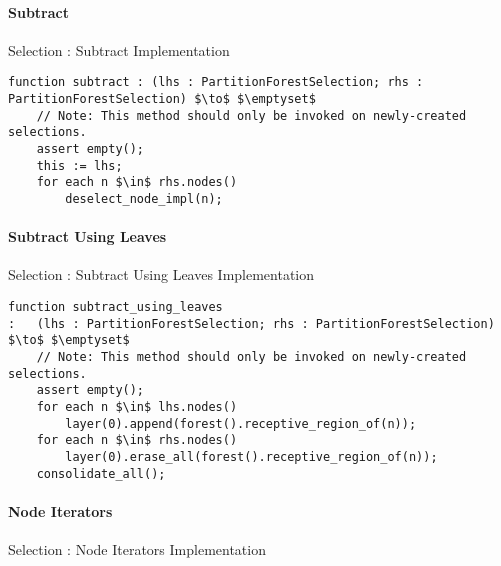 \paragraph{Subtract}

\begin{stulisting}[H]
\caption{Selection : Subtract Implementation}
\begin{lstlisting}[style=Default]
function subtract : (lhs : PartitionForestSelection; rhs : PartitionForestSelection) $\to$ $\emptyset$
	// Note: This method should only be invoked on newly-created selections.
	assert empty();
	this := lhs;
	for each n $\in$ rhs.nodes()
		deselect_node_impl(n);
\end{lstlisting}
\end{stulisting}

\paragraph{Subtract Using Leaves}

\begin{stulisting}[H]
\caption{Selection : Subtract Using Leaves Implementation}
\begin{lstlisting}[style=Default]
function subtract_using_leaves
:	(lhs : PartitionForestSelection; rhs : PartitionForestSelection) $\to$ $\emptyset$
	// Note: This method should only be invoked on newly-created selections.
	assert empty();
	for each n $\in$ lhs.nodes()
		layer(0).append(forest().receptive_region_of(n));
	for each n $\in$ rhs.nodes()
		layer(0).erase_all(forest().receptive_region_of(n));
	consolidate_all();
\end{lstlisting}
\end{stulisting}

\paragraph{Node Iterators}

\begin{stulisting}[H]
\caption{Selection : Node Iterators Implementation}

\end{stulisting}

